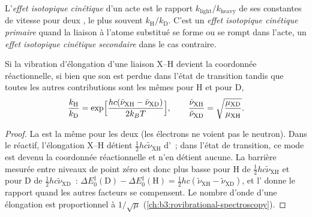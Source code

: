 \begin{definition}\label{def:b3:rate-theories:kie}
L'\emph{effet isotopique cinétique} d'un acte est le
rapport $k_{\mathrm{light}}/k_{\mathrm{heavy}}$ de ses constantes de
vitesse pour deux , le plus souvent
$k_{\mathrm H}/k_{\mathrm D}$. C'est un \emph{effet isotopique cinétique
primaire}
quand la liaison à l'atome substitué se forme ou se rompt dans l'acte,
un \emph{effet isotopique cinétique secondaire}
dans le cas contraire.
\end{definition}

\begin{proposition}\label{prop:b3:rate-theories:primary-kie}
Si la vibration d'élongation d'une liaison X--H devient la coordonnée
réactionnelle, si bien que son  est perdue dans
l'état de transition tandis que toutes les autres contributions sont
les mêmes pour H et pour D,
\[
  \frac{k_{\mathrm H}}{k_{\mathrm D}} = \exp\Bigl[\frac{hc(\tilde\nu_{\mathrm{XH}} - \tilde\nu_{\mathrm{XD}})}{2k_BT}\Bigr],
  \qquad \frac{\tilde\nu_{\mathrm{XH}}}{\tilde\nu_{\mathrm{XD}}} = \sqrt{\frac{\mu_{\mathrm{XD}}}{\mu_{\mathrm{XH}}}} .
\]
\end{proposition}

\begin{proof}
La  est la même pour les deux 
(les électrons ne voient pas le neutron). Dans le réactif, l'élongation
X--H détient
$\frac12hc\tilde\nu_{\mathrm{XH}}$ d'~; dans l'état
de transition, ce mode est devenu la coordonnée réactionnelle et n'en
détient aucune. La barrière mesurée entre niveaux de point zéro est donc
plus basse pour H de $\frac12hc\tilde\nu_{\mathrm{XH}}$ et pour D de $\frac12hc\tilde\nu_{\mathrm{XD}}$~: $\Delta E_0^{\ddagger}(\mathrm D) -
\Delta E_0^{\ddagger}(\mathrm H) = \frac12hc(\tilde\nu_{\mathrm{XH}} - \tilde\nu_{\mathrm{XD}})$,
et l' donne le rapport quand les autres facteurs se
compensent. Le nombre d'onde d'une élongation est proportionnel à
$1/\sqrt\mu$ (\cref{ch:b3:rovibrational-spectroscopy}).
\end{proof}

